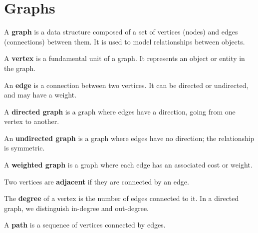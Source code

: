 \documentclass[11pt,a4paper,openany]{book}
\begin{document}
\chapter{Graphs}


\begin{defnbox}[title=Graph (Graphe)]
A \textbf{graph} is a data structure composed of a set of vertices (nodes) and edges (connections) between them.  
It is used to model relationships between objects.
\end{defnbox}

\begin{defnbox}[title=Vertex (Node)]
A \textbf{vertex} is a fundamental unit of a graph.  
It represents an object or entity in the graph.
\end{defnbox}

\begin{defnbox}[title=Edge]
An \textbf{edge} is a connection between two vertices.  
It can be directed or undirected, and may have a weight.
\end{defnbox}

\begin{defnbox}[title=Directed Graph (Digraph)]
A \textbf{directed graph} is a graph where edges have a direction, going from one vertex to another.
\end{defnbox}

\begin{defnbox}[title=Undirected Graph]
An \textbf{undirected graph} is a graph where edges have no direction; the relationship is symmetric.
\end{defnbox}

\begin{defnbox}[title=Weighted Graph]
A \textbf{weighted graph} is a graph where each edge has an associated cost or weight.
\end{defnbox}

\begin{defnbox}[title=Adjacent vertices]
Two vertices are \textbf{adjacent} if they are connected by an edge.
\end{defnbox}

\begin{defnbox}[title=Degree]
The \textbf{degree} of a vertex is the number of edges connected to it.
In a directed graph, we distinguish in-degree and out-degree.
\end{defnbox}

\begin{defnbox}[title=Path]
A \textbf{path} is a sequence of vertices connected by edges.
\end{defnbox}
\end{document}
